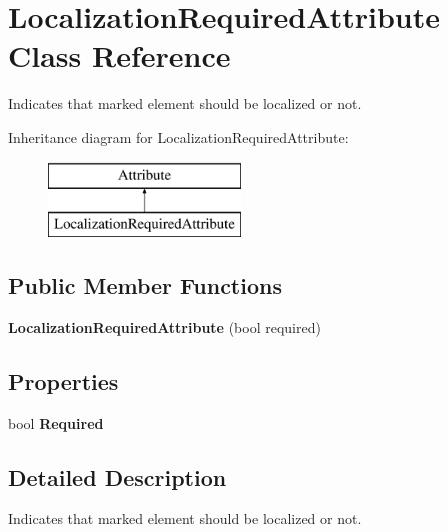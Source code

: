 \hypertarget{class_localization_required_attribute}{}\section{Localization\+Required\+Attribute Class Reference}
\label{class_localization_required_attribute}


Indicates that marked element should be localized or not.  


Inheritance diagram for Localization\+Required\+Attribute\+:\begin{figure}[H]
\begin{center}
\leavevmode
\includegraphics[height=2.000000cm]{class_localization_required_attribute}
\end{center}
\end{figure}
\subsection*{Public Member Functions}
\begin{DoxyCompactItemize}
\item 
\hypertarget{class_localization_required_attribute_a7d6235d2f8883d6f6311ca2a95156a9c}{}{\bfseries Localization\+Required\+Attribute} (bool required)\label{class_localization_required_attribute_a7d6235d2f8883d6f6311ca2a95156a9c}

\end{DoxyCompactItemize}
\subsection*{Properties}
\begin{DoxyCompactItemize}
\item 
\hypertarget{class_localization_required_attribute_af8b46c34356964b9b15c22c7e5113d23}{}bool {\bfseries Required}\label{class_localization_required_attribute_af8b46c34356964b9b15c22c7e5113d23}

\end{DoxyCompactItemize}


\subsection{Detailed Description}
Indicates that marked element should be localized or not. 


